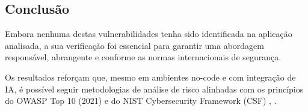 \subsection{Conclusão}

Embora nenhuma destas vulnerabilidades tenha sido identificada na aplicação analisada, a sua verificação foi essencial para garantir uma abordagem responsável, abrangente e conforme as normas internacionais de segurança.

Os resultados reforçam que, mesmo em ambientes no-code e com integração de IA, é possível seguir metodologias de análise de risco alinhadas com os princípios do OWASP Top 10 (2021) e do NIST Cybersecurity Framework (CSF) \cite{ref2}, \cite{ref4}.
